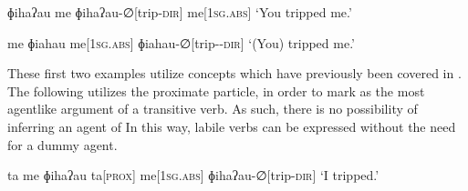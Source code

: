 \ex
\begingl
\glpreamble ɸihaʔau me
\endpreamble
ɸihaʔau-∅[trip\textsc{-dir}]
me[\textsc{1sg.abs}]
\glft `You tripped me.'
\endgl
\xe

\ex
\begingl
\glpreamble me ɸiahau
\endpreamble
me[\textsc{1sg.abs}]
ɸiahau-∅[trip-\textsc{-dir}]
\glft `(You) tripped me.'
\endgl
\xe

These first two examples utilize concepts which have previously been covered in . The following utilizes the proximate particle,  in order to mark  as the most agentlike argument of a transitive verb. As such, there is no possibility of inferring an agent of  In this way, labile verbs can be expressed without the need for a dummy agent.

\ex
\begingl
\glpreamble ta me ɸihaʔau
\endpreamble
ta[\textsc{prox}]
me[\textsc{1sg.abs}]
ɸihaʔau-∅[trip\textsc{-dir}]
\glft `I tripped.'
\endgl
\xe
